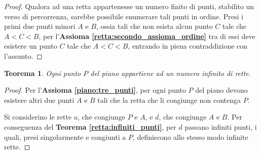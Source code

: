 \documentclass{article}
\newtheorem{theorem}{Teorema}[section]
\theoremstyle{definition}
\begin{document}
\begin{proof}
    Qualora ad una retta appartenesse un numero finito di punti,
    stabilito un verso di percorrenza, sarebbe possibile enumerare
    tali punti in ordine. Presi i primi due punti minori $A$ e $B$,
    ossia tali che non esista alcun punto $C$ tale che $A<C<B$, per
    l'\textbf{Assioma \ref{retta:secondo_assioma_ordine}} tra di essi deve
    esistere un punto $C$ tale che $A<C<B$, entrando
    in piena contraddizione con l'assunto.
\end{proof}

\begin{theorem}
    Ogni punto $P$ del piano appartiene ad un numero infinito di rette.
\end{theorem}

\begin{proof}
    Per l'\textbf{Assioma \ref{piano:tre_punti}}, per ogni
    punto $P$ del piano devono esistere altri due punti $A$ e $B$
    tali che la retta che li congiunge non contenga $P$.

    Si considerino le rette $a$, che congiunge $P$ e $A$, e $d$,
    che congiunge $A$ e $B$. Per conseguenza del
    \textbf{Teorema \ref{retta:infiniti_punti}},
    per $d$ passano infiniti punti, i quali, presi singolarmente
    e congiunti a $P$, definiscono allo stesso modo infinite
    rette.
\end{proof}
\end{document}
